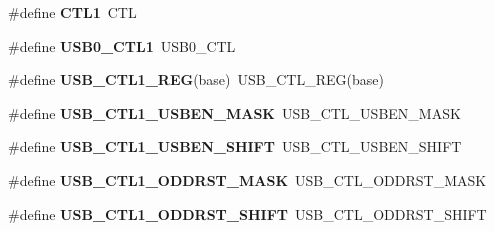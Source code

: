 \begin{DoxyCompactItemize}
\item 
\mbox{\label{group___s_d_k___compatibility___symbols_ga88cacf79f1f98547cac03cc2f81205ec}} 
\#define {\bfseries C\+T\+L1}~C\+TL
\item 
\mbox{\label{group___s_d_k___compatibility___symbols_gaf60e393a9a340183ff861a54cb7e940a}} 
\#define {\bfseries U\+S\+B0\+\_\+\+C\+T\+L1}~U\+S\+B0\+\_\+\+C\+TL
\item 
\mbox{\label{group___s_d_k___compatibility___symbols_ga463d7c71289f7bb0c6efbe622d34eb8e}} 
\#define {\bfseries U\+S\+B\+\_\+\+C\+T\+L1\+\_\+\+R\+EG}(base)~U\+S\+B\+\_\+\+C\+T\+L\+\_\+\+R\+EG(base)
\item 
\mbox{\label{group___s_d_k___compatibility___symbols_ga6a436e8b204ca086d015e83de2e3994d}} 
\#define {\bfseries U\+S\+B\+\_\+\+C\+T\+L1\+\_\+\+U\+S\+B\+E\+N\+\_\+\+M\+A\+SK}~U\+S\+B\+\_\+\+C\+T\+L\+\_\+\+U\+S\+B\+E\+N\+\_\+\+M\+A\+SK
\item 
\mbox{\label{group___s_d_k___compatibility___symbols_ga711c5102c8b7e1b7bed63d13d97f4cc9}} 
\#define {\bfseries U\+S\+B\+\_\+\+C\+T\+L1\+\_\+\+U\+S\+B\+E\+N\+\_\+\+S\+H\+I\+FT}~U\+S\+B\+\_\+\+C\+T\+L\+\_\+\+U\+S\+B\+E\+N\+\_\+\+S\+H\+I\+FT
\item 
\mbox{\label{group___s_d_k___compatibility___symbols_ga6d6719b30f8cf2d9af1da634302ba115}} 
\#define {\bfseries U\+S\+B\+\_\+\+C\+T\+L1\+\_\+\+O\+D\+D\+R\+S\+T\+\_\+\+M\+A\+SK}~U\+S\+B\+\_\+\+C\+T\+L\+\_\+\+O\+D\+D\+R\+S\+T\+\_\+\+M\+A\+SK
\item 
\mbox{\label{group___s_d_k___compatibility___symbols_gaa154e7adcd716eb25aacda83a63544d7}} 
\#define {\bfseries U\+S\+B\+\_\+\+C\+T\+L1\+\_\+\+O\+D\+D\+R\+S\+T\+\_\+\+S\+H\+I\+FT}~U\+S\+B\+\_\+\+C\+T\+L\+\_\+\+O\+D\+D\+R\+S\+T\+\_\+\+S\+H\+I\+FT
\item 
\mbox{\label{group___s_d_k___compatibility___symbols_ga8da1565c088db05ad25683e584fa7a9b}} 

\end{DoxyCompactItemize}
